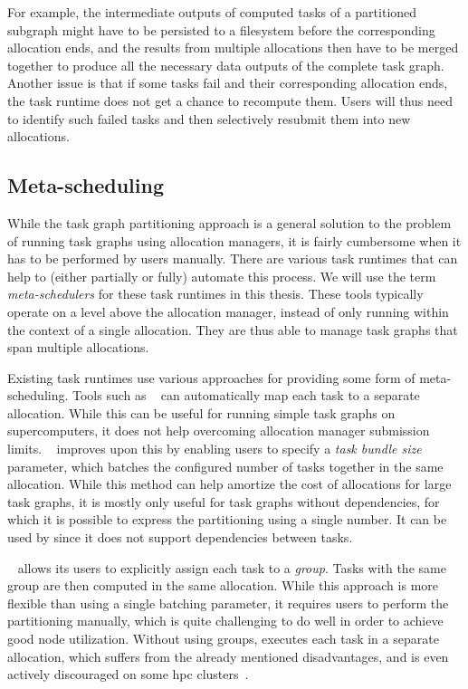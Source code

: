 For example, the intermediate outputs of computed tasks of a partitioned subgraph might have to be
persisted to a filesystem before the corresponding allocation ends, and the results from multiple
allocations then have to be merged together to produce all the necessary data outputs of the
complete task graph. Another issue is that if some tasks fail and their corresponding allocation
ends, the task runtime does not get a chance to recompute them. Users will thus need to identify
such failed tasks and then selectively resubmit them into new allocations.

\subsection*{Meta-scheduling}
While the task graph partitioning approach is a general solution to the problem of running task
graphs using allocation managers, it is fairly cumbersome when it has to be performed by users
manually. There are various task runtimes that can help to (either partially or fully) automate
this process. We will use the term \emph{meta-schedulers} for these task runtimes in this thesis.
These tools typically operate on a level above the allocation manager, instead of only running
within the context of a single allocation. They are thus able to manage task graphs that span
multiple allocations.

Existing task runtimes use various approaches for providing some form of meta-scheduling. Tools
such as \gnuparallel{}~\cite{parallel} can automatically map each task to a
separate allocation. While this can be useful for running simple task graphs on supercomputers, it
does not help overcoming allocation manager submission limits.
\hypershell{}~\cite{hypershell} improves upon this by enabling users to specify a
\emph{task bundle size} parameter, which batches the configured number of tasks together in the
same allocation. While this method can help amortize the cost of allocations for large task graphs,
it is mostly only useful for task graphs without dependencies, for which it is possible to express
the partitioning using a single number. It can be used by \hypershell{} since it does not
support dependencies between tasks.

\snakemake{}~\cite{snakemake} allows its users to explicitly assign each task to
a \emph{group}. Tasks with the same group are then computed in the same allocation.
While this approach is more flexible than using a single batching parameter, it requires users to
perform the partitioning manually, which is quite challenging to do well in order to achieve good
node utilization. Without using groups, \snakemake{} executes each task in a separate
allocation, which suffers from the already mentioned disadvantages, and is even actively
discouraged on some \gls{hpc} clusters~\cite{nersc-snakemake}.

